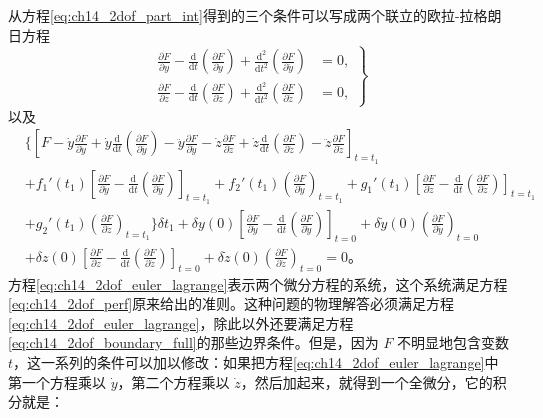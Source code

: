 从方程\eqref{eq:ch14_2dof_part_int}得到的三个条件可以写成两个联立的欧拉-拉格朗日方程
\begin{equation}
\left.
\begin{aligned}
\frac{\partial F}{\partial y}
-\frac{\mathrm{d}}{\mathrm{d}t}\left(\frac{\partial F}{\partial \dot{y}}\right)
+\frac{\mathrm{d}^2}{\mathrm{d}t^2}\left(\frac{\partial F}{\partial \ddot{y}}\right) &= 0, \\
\frac{\partial F}{\partial z}
-\frac{\mathrm{d}}{\mathrm{d}t}\left(\frac{\partial F}{\partial \dot{z}}\right)
+\frac{\mathrm{d}^2}{\mathrm{d}t^2}\left(\frac{\partial F}{\partial \ddot{z}}\right) &= 0,
\end{aligned}
\right\}
\label{eq:ch14_2dof_euler_lagrange}
\end{equation}
以及
\begin{equation}
\begin{aligned}
&\bigg\{
\left[
F-\dot{y}\frac{\partial F}{\partial \dot{y}}
+\dot{y}\frac{\mathrm{d}}{\mathrm{d}t}\left(\frac{\partial F}{\partial \ddot{y}}\right)
-\ddot{y}\frac{\partial F}{\partial \ddot{y}}
-\dot{z}\frac{\partial F}{\partial \dot{z}}
+\dot{z}\frac{\mathrm{d}}{\mathrm{d}t}\left(\frac{\partial F}{\partial \ddot{z}}\right)
-\ddot{z}\frac{\partial F}{\partial \ddot{z}}
\right]_{t=t_1} \\
&+f_1'(t_1)\left[
\frac{\partial F}{\partial \dot{y}}
-\frac{\mathrm{d}}{\mathrm{d}t}\left(\frac{\partial F}{\partial \ddot{y}}\right)
\right]_{t=t_1}
+f_2'(t_1)\left(\frac{\partial F}{\partial \ddot{y}}\right)_{t=t_1}
+g_1'(t_1)\left[
\frac{\partial F}{\partial \dot{z}}
-\frac{\mathrm{d}}{\mathrm{d}t}\left(\frac{\partial F}{\partial \ddot{z}}\right)
\right]_{t=t_1} \\
&+g_2'(t_1)\left(\frac{\partial F}{\partial \ddot{z}}\right)_{t=t_1}
\bigg\}\delta t_1
+\delta y(0)\left[
\frac{\partial F}{\partial \dot{y}}
-\frac{\mathrm{d}}{\mathrm{d}t}\left(\frac{\partial F}{\partial \ddot{y}}\right)
\right]_{t=0}
+\delta\dot{y}(0)\left(\frac{\partial F}{\partial \ddot{y}}\right)_{t=0} \\
&+\delta z(0)\left[
\frac{\partial F}{\partial \dot{z}}
-\frac{\mathrm{d}}{\mathrm{d}t}\left(\frac{\partial F}{\partial \ddot{z}}\right)
\right]_{t=0}
+\delta\dot{z}(0)\left(\frac{\partial F}{\partial \ddot{z}}\right)_{t=0}
= 0。
\end{aligned}
\label{eq:ch14_2dof_boundary_full}
\end{equation}
方程\eqref{eq:ch14_2dof_euler_lagrange}表示两个微分方程的系统，这个系统满足方程\eqref{eq:ch14_2dof_perf}原来给出的准则。这种问题的物理解答必须满足方程\eqref{eq:ch14_2dof_euler_lagrange}，除此以外还要满足方程\eqref{eq:ch14_2dof_boundary_full}的那些边界条件。但是，因为 $F$ 不明显地包含变数 $t$，这一系列的条件可以加以修改：如果把方程\eqref{eq:ch14_2dof_euler_lagrange}中第一个方程乘以 $\dot{y}$，第二个方程乘以 $\dot{z}$，然后加起来，就得到一个全微分，它的积分就是：
